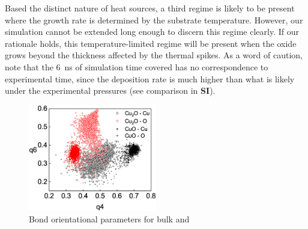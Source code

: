 \documentclass[manuscript=cmatex]{achemso}
\begin{document}
Based the distinct nature of heat sources, a third regime is likely to be present where the growth rate is determined by the substrate temperature. However, our simulation cannot be extended long enough to discern this regime clearly. If our rationale holds, this temperature-limited regime will be present when the oxide grows beyond the thickness affected by the thermal spikes. As a word of caution, note that the \SI{6}{ns} of simulation time covered has no correspondence to experimental time, since the deposition rate is much higher than what is likely under the experimental pressures (see comparison in \textbf{SI}).




\begin{figure}[h]
  \centering
  \includegraphics[width=0.5\textwidth]{cuo_id.eps}
  \caption[Bond orientational order parameter for bulk]{Bond orientational parameters for bulk  and }
  \label{fig:cuo_id}
\end{figure}
\end{document}
